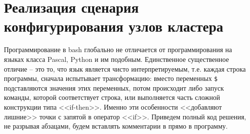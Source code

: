 \documentclass[a4paper,12pt,final,openany]{extbook}
\begin{document}
\section{Реализация сценария конфигурирования узлов кластера}
Программирование в bash глобально не отличается от программирования на языках класса Pascal, Python и им подобным. Единственное существенное отличие -- это то, что язык является чисто интерпретируемым, т.е. каждая строка программы, сначала испытывает трансформацию: вместо переменных \texttt{\$<имя переменной>} подставляются значения этих переменных, потом происходит либо запуск команды, которой соответствует строка, или выполняется часть сложной конструкции типа <<if-then>>. Именно эти особенности <<добавляют лишние>> точки с запятой в оператор <<if>>. Приведем полный код решения, не разрывая абзацами, будем вставлять комментарии в прямо в программу.
\end{document}
